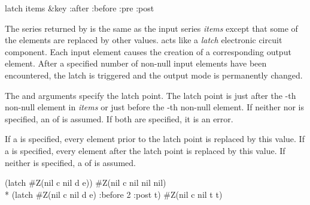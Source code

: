 \begin{defun}[Function]
latch items &key :after :before :pre :post

The series returned by  is the same as the input series
\emph{items} except that some of the elements are replaced by other
values.   acts like a \emph{latch} electronic circuit
component.  Each input element causes the creation of a corresponding
output element.  After a specified number of non-null input elements
have been encountered, the latch is triggered and the output mode is
permanently changed.

The  and  arguments specify the latch point.
The latch point is just after the -th non-null element in
\emph{items} or just before the -th non-null element.  If
neither  nor  is specified, an 
of  is assumed.  If both are specified, it is an error.

If a  is specified, every element prior to the latch point
is replaced by this value.  If a  is specified, every element
after the latch point is replaced by this value.  If neither is
specified, a  of  is assumed.
\begin{lisp}
(latch \#Z(nil c nil d e)) {\EV} \#Z(nil c nil nil nil) \\*
(latch \#Z(nil c nil d e) :before 2 :post t) {\EV} \#Z(nil c nil t t)
\end{lisp}
\end{defun}


